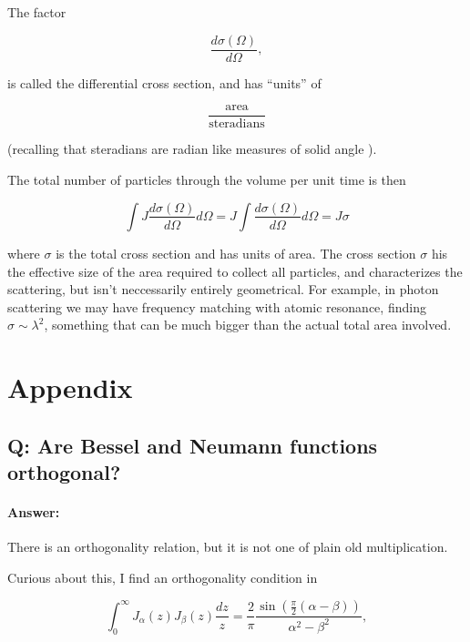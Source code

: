 The factor

\begin{equation}\label{eqn:qmTwoL23:740}
\frac{d \sigma(\Omega)}{d\Omega},
\end{equation}

is called the differential cross section, and has ``units'' of 

\begin{equation}\label{eqn:qmTwoL23:760}
\frac{\text{area}}{\text{steradians}}
\end{equation}

(recalling that steradians are radian like measures of solid angle \cite{wiki:steradian}).

The total number of particles through the volume per unit time is then

\begin{equation}\label{eqn:qmTwoL23:780}
\int J \frac{d \sigma(\Omega)}{d\Omega} d\Omega
= J \int \frac{d \sigma(\Omega)}{d\Omega} d\Omega
= J \sigma
\end{equation}

where $\sigma$ is the total cross section and has units of area.  The cross section $\sigma$ his the effective size of the area required to collect all particles, and characterizes the scattering, but isn't neccessarily entirely geometrical.  For example, in photon scattering we may have frequency matching with atomic resonance, finding $\sigma \sim \lambda^2$, something that can be much bigger than the actual total area involved.


\section{Appendix}

\subsection{Q: Are Bessel and Neumann functions orthogonal?}

\paragraph{Answer:} There is an orthogonality relation, but it is not one of plain old multiplication.

Curious about this, I find an orthogonality condition in \cite{wiki:bessel}

\begin{equation}\label{eqn:qmTwoL23:640}
\int_0^\infty J_\alpha(z) J_\beta(z) \frac{dz}{z} = \frac{2}{\pi} \frac{\sin\left(\frac{\pi}{2}\left( \alpha - \beta\right) \right) }{\alpha^2 - \beta^2},
\end{equation}

